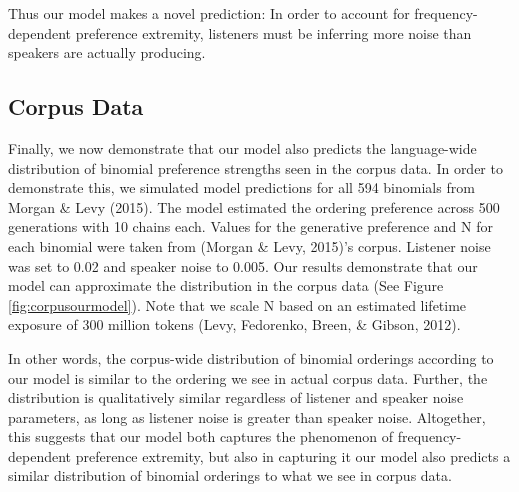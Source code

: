 \documentclass[10pt, letterpaper]{article}
\begin{document}
Thus our model makes a novel prediction: In order to account for
frequency-dependent preference extremity, listeners must be inferring
more noise than speakers are actually producing.

\hypertarget{corpus-data}{%
\subsection{Corpus Data}\label{corpus-data}}

Finally, we now demonstrate that our model also predicts the
language-wide distribution of binomial preference strengths seen in the
corpus data. In order to demonstrate this, we simulated model
predictions for all 594 binomials from Morgan \& Levy (2015). The model
estimated the ordering preference across 500 generations with 10 chains
each. Values for the generative preference and N for each binomial were
taken from (Morgan \& Levy, 2015)'s corpus. Listener noise was set to
0.02 and speaker noise to 0.005. Our results demonstrate that our model
can approximate the distribution in the corpus data (See Figure
\ref{fig:corpusourmodel}). Note that we scale N based on an estimated
lifetime exposure of 300 million tokens (Levy, Fedorenko, Breen, \&
Gibson, 2012).

In other words, the corpus-wide distribution of binomial orderings
according to our model is similar to the ordering we see in actual
corpus data. Further, the distribution is qualitatively similar
regardless of listener and speaker noise parameters, as long as listener
noise is greater than speaker noise. Altogether, this suggests that our
model both captures the phenomenon of frequency-dependent preference
extremity, but also in capturing it our model also predicts a similar
distribution of binomial orderings to what we see in corpus data.
\end{document}
